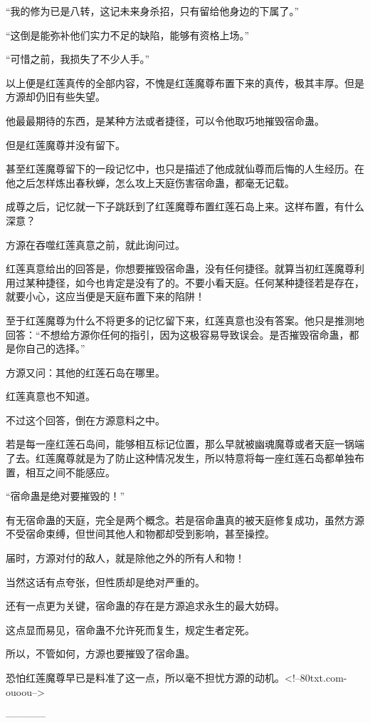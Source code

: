 \begin{this_body}
“我的修为已是八转，这记未来身杀招，只有留给他身边的下属了。”

“这倒是能弥补他们实力不足的缺陷，能够有资格上场。”

“可惜之前，我损失了不少人手。”

以上便是红莲真传的全部内容，不愧是红莲魔尊布置下来的真传，极其丰厚。但是方源却仍旧有些失望。

他最最期待的东西，是某种方法或者捷径，可以令他取巧地摧毁宿命蛊。

但是红莲魔尊并没有留下。

甚至红莲魔尊留下的一段记忆中，也只是描述了他成就仙尊而后悔的人生经历。在他之后怎样炼出春秋蝉，怎么攻上天庭伤害宿命蛊，都毫无记载。

成尊之后，记忆就一下子跳跃到了红莲魔尊布置红莲石岛上来。这样布置，有什么深意？

方源在吞噬红莲真意之前，就此询问过。

红莲真意给出的回答是，你想要摧毁宿命蛊，没有任何捷径。就算当初红莲魔尊利用过某种捷径，如今也肯定是没有了的。不要小看天庭。任何某种捷径若是存在，就要小心，这应当便是天庭布置下来的陷阱！

至于红莲魔尊为什么不将更多的记忆留下来，红莲真意也没有答案。他只是推测地回答：“不想给方源你任何的指引，因为这极容易导致误会。是否摧毁宿命蛊，都是你自己的选择。”

方源又问：其他的红莲石岛在哪里。

红莲真意也不知道。

不过这个回答，倒在方源意料之中。

若是每一座红莲石岛间，能够相互标记位置，那么早就被幽魂魔尊或者天庭一锅端了去。红莲魔尊就是为了防止这种情况发生，所以特意将每一座红莲石岛都单独布置，相互之间不能感应。

“宿命蛊是绝对要摧毁的！”

有无宿命蛊的天庭，完全是两个概念。若是宿命蛊真的被天庭修复成功，虽然方源不受宿命束缚，但世间其他人和物都却受到影响，甚至操控。

届时，方源对付的敌人，就是除他之外的所有人和物！

当然这话有点夸张，但性质却是绝对严重的。

还有一点更为关键，宿命蛊的存在是方源追求永生的最大妨碍。

这点显而易见，宿命蛊不允许死而复生，规定生者定死。

所以，不管如何，方源也要摧毁了宿命蛊。

恐怕红莲魔尊早已是料准了这一点，所以毫不担忧方源的动机。<!--80txt.com-ouoou-->

------------

\end{this_body}

